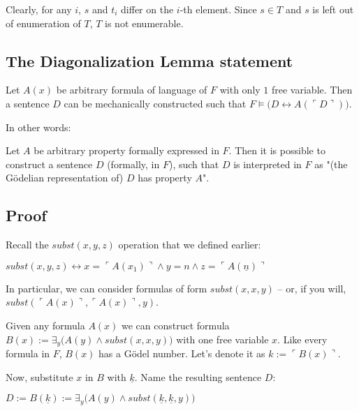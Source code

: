 \documentclass{article}
\begin{document}
Clearly, for any $i$, $s$ and $t_i$ differ on the $i$-th element.
Since $s \in T$ and $s$ is left out of enumeration of $T$, $T$ is not enumerable.

\subsection{The Diagonalization Lemma statement}

\begin{center}
    Let $A(x)$ be arbitrary formula of language of $F$ with only $1$ free variable. Then a sentence $D$ can be
    mechanically constructed such that $F \models \bigl( D \leftrightarrow A(\ulcorner D \urcorner) \bigl)$.
\end{center}

In other words:

\begin{center}
    Let $A$ be arbitrary property formally expressed in $F$. Then it is possible to construct a sentence $D$
    (formally, in $F$), such that $D$ is interpreted in $F$ as "(the Gödelian representation of) $D$ has property $A$".
\end{center}

\subsection{Proof}

Recall the $subst(x, y, z)$ operation that we defined earlier:

\begin{center}
    $subst(x, y, z) \leftrightarrow x = \ulcorner A(x_1) \urcorner \land y = n \land z = \ulcorner A(\underline{n}) \urcorner$
\end{center}

In particular, we can consider formulas of form $subst(x, x, y)$ -- or, if you 
will, $subst(\ulcorner A(x) \urcorner, \ulcorner A(x) \urcorner, y)$.

Given any formula $A(x)$ we can construct formula
$B(x) := \exists_{y} \bigl( A(y) \land subst(x, x, y) \bigr)$
with one free variable $x$. Like every formula in $F$, $B(x)$ has a Gödel number.
Let's denote it as $k := \ulcorner B(x) \urcorner$.

Now, substitute $x$ in $B$ with $\underline{k}$. Name the resulting sentence $D$:

\begin{center}
    $D := B(\underline{k}) := \exists_y \bigl(
        A(y) \land subst(\underline{k}, \underline{k}, y)
    \bigr)$
\end{center}
\end{document}
